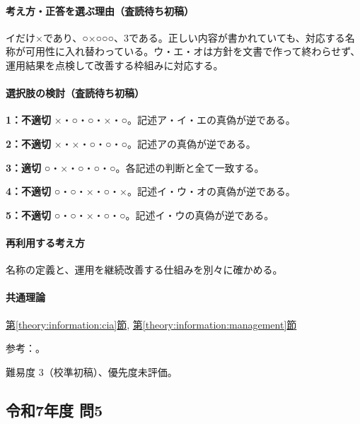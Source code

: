 \paragraph{考え方・正答を選ぶ理由（査読待ち初稿）} イだけ×であり、○×○○○、3である。正しい内容が書かれていても、対応する名称が可用性に入れ替わっている。ウ・エ・オは方針を文書で作って終わらせず、運用結果を点検して改善する枠組みに対応する。

\paragraph{選択肢の検討（査読待ち初稿）}\mbox{}\par

\noindent\textbf{1：不適切} ×・○・○・×・○。記述ア・イ・エの真偽が逆である。\par

\noindent\textbf{2：不適切} ×・×・○・○・○。記述アの真偽が逆である。\par

\noindent\textbf{3：適切} ○・×・○・○・○。各記述の判断と全て一致する。\par

\noindent\textbf{4：不適切} ○・○・×・○・×。記述イ・ウ・オの真偽が逆である。\par

\noindent\textbf{5：不適切} ○・○・×・○・○。記述イ・ウの真偽が逆である。\par

\paragraph{再利用する考え方} 名称の定義と、運用を継続改善する仕組みを別々に確かめる。

\paragraph{共通理論} \hyperref[theory:information:cia]{第\ref*{theory:information:cia}節}, \hyperref[theory:information:management]{第\ref*{theory:information:management}節}

\par 参考：\cite{iso27000_2009}。

\par 難易度 3（校準初稿）、優先度未評価。

\subsection{令和7年度 問5}
\label{q:r07-reg-apt-05}

